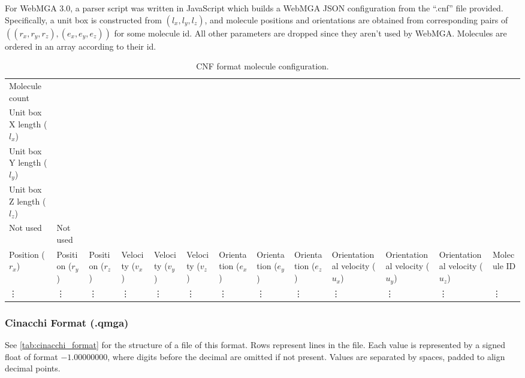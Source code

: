 For WebMGA 3.0, a parser script was written in JavaScript which builds a WebMGA JSON configuration from the ``.cnf'' file provided. Specifically, a unit box is constructed from $(l_x, l_y, l_z)$, and molecule positions and orientations are obtained from corresponding pairs of $((r_x,r_y,r_z),(e_x,e_y,e_z))$ for some molecule id. All other parameters are dropped since they aren't used by WebMGA. Molecules are ordered in an array according to their id.
\begin{table}
  \begin{center}
  \begin{adjustbox}{width=\textwidth}
    \begin{tabular}{lllllllllllll}
      \hline\hline
      Molecule count & & & & & & & & & & & &\\
      Unit box X length ($l_x$) & & & & & & & & & & & &\\
      Unit box Y length ($l_y$) & & & & & & & & & & & &\\
      Unit box Z length ($l_z$) & & & & & & & & & & & &\\
      Not used & Not used & & & & & & & & & & &\\
      Position ($r_x$) & Position ($r_y$) & Position ($r_z$) & Velocity ($v_x$) & Velocity ($v_y$) & Velocity ($v_z$) & Orientation ($e_x$) & Orientation ($e_y$) & Orientation ($e_z$) & Orientational velocity ($u_x$) & Orientational velocity ($u_y$) & Orientational velocity ($u_z$) & Molecule ID\\
      \vdots & \vdots & \vdots & \vdots & \vdots & \vdots & \vdots & \vdots & \vdots & \vdots & \vdots & \vdots & \vdots \\
       \hline\hline
    \end{tabular}
  \end{adjustbox}
  \end{center}
  \caption{CNF format molecule configuration.}
  \label{tab:lammps_format}
\end{table}

\subsubsection{Cinacchi Format (.qmga)}
See \cref{tab:cinacchi_format} for the structure of a file of this format. Rows represent lines in the file. Each value is represented by a signed float of format $-1.00000000$, where digits before the decimal are omitted if not present. Values are separated by spaces, padded to align decimal points.

